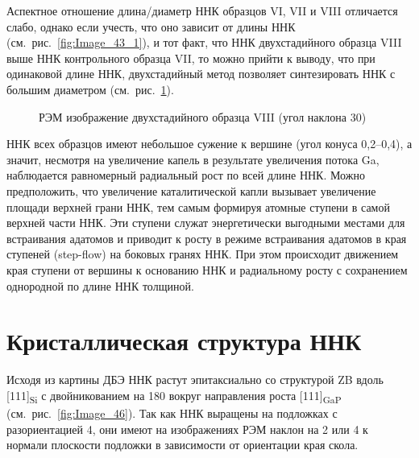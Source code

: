 Аспектное отношение длина/диаметр ННК образцов VI, VII и VIII отличается слабо,
однако если учесть, что оно зависит от длины ННК
(см.~рис.~\cref{fig:Image_43_1}), и тот факт, что ННК двухстадийного образца
VIII выше ННК контрольного образца VII, то можно прийти к выводу, что при
одинаковой длине ННК, двухстадийный метод позволяет синтезировать ННК с большим
диаметром (см.~рис.~\cref{fig:Image_45}).

\begin{figure}[ht]  \caption{РЭМ изображение
	двухстадийного образца VIII (угол наклона 30{\textdegree})}\label{fig:Image_45}
\end{figure}

ННК всех образцов имеют небольшое сужение к вершине (угол конуса
0,2--0,4{\textdegree}), а значит, несмотря на увеличение капель в результате
увеличения потока Ga, наблюдается равномерный радиальный рост по всей длине
ННК. Можно предположить, что увеличение каталитической капли вызывает
увеличение площади верхней грани ННК, тем самым формируя атомные ступени в
самой верхней части ННК. Эти ступени служат энергетически выгодными местами для
встраивания адатомов и приводит к росту в режиме встраивания адатомов в края
ступеней (step-flow) на боковых гранях ННК. При этом происходит движением края
ступени от вершины к основанию ННК и радиальному росту с сохранением однородной
по длине ННК толщиной.

\section{Кристаллическая структура ННК}\label{sec:ch5/sec7}

Исходя из картины ДБЭ ННК растут эпитаксиально со структурой ZB вдоль
[111]\textsubscript{Si} с двойникованием на 180{\textdegree} вокруг направления
роста [111]\textsubscript{GaP} (см.~рис.~\cref{fig:Image_46}). Так как ННК
выращены на подложках с разориентацией 4{\textdegree}, они имеют на
изображениях РЭМ наклон на 2{\textdegree} или 4{\textdegree} к нормали
плоскости подложки в зависимости от ориентации края скола.

